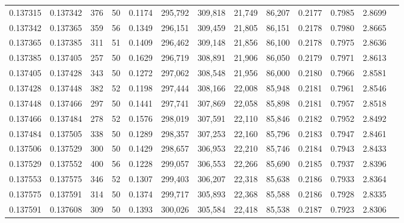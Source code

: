 \begin{tabular}{rrrrrrrrrrrrr}
0.137315 & 0.137342 &   376 &  50 &                                     0.1174 & 295,792 & 309,818 &  21,749 &  86,207 & 0.2177 & 0.7985 & 2.8699 \\
0.137342 & 0.137365 &   359 &  56 &                                     0.1349 & 296,151 & 309,459 &  21,805 &  86,151 & 0.2178 & 0.7980 & 2.8665 \\
0.137365 & 0.137385 &   311 &  51 &                                     0.1409 & 296,462 & 309,148 &  21,856 &  86,100 & 0.2178 & 0.7975 & 2.8636 \\
0.137385 & 0.137405 &   257 &  50 &                                     0.1629 & 296,719 & 308,891 &  21,906 &  86,050 & 0.2179 & 0.7971 & 2.8613 \\
0.137405 & 0.137428 &   343 &  50 &                                     0.1272 & 297,062 & 308,548 &  21,956 &  86,000 & 0.2180 & 0.7966 & 2.8581 \\
0.137428 & 0.137448 &   382 &  52 &                                     0.1198 & 297,444 & 308,166 &  22,008 &  85,948 & 0.2181 & 0.7961 & 2.8546 \\
0.137448 & 0.137466 &   297 &  50 &                                     0.1441 & 297,741 & 307,869 &  22,058 &  85,898 & 0.2181 & 0.7957 & 2.8518 \\
0.137466 & 0.137484 &   278 &  52 &                                     0.1576 & 298,019 & 307,591 &  22,110 &  85,846 & 0.2182 & 0.7952 & 2.8492 \\
0.137484 & 0.137505 &   338 &  50 &                                     0.1289 & 298,357 & 307,253 &  22,160 &  85,796 & 0.2183 & 0.7947 & 2.8461 \\
0.137506 & 0.137529 &   300 &  50 &                                     0.1429 & 298,657 & 306,953 &  22,210 &  85,746 & 0.2184 & 0.7943 & 2.8433 \\
0.137529 & 0.137552 &   400 &  56 &                                     0.1228 & 299,057 & 306,553 &  22,266 &  85,690 & 0.2185 & 0.7937 & 2.8396 \\
0.137553 & 0.137575 &   346 &  52 &                                     0.1307 & 299,403 & 306,207 &  22,318 &  85,638 & 0.2186 & 0.7933 & 2.8364 \\
0.137575 & 0.137591 &   314 &  50 &                                     0.1374 & 299,717 & 305,893 &  22,368 &  85,588 & 0.2186 & 0.7928 & 2.8335 \\
0.137591 & 0.137608 &   309 &  50 &                                     0.1393 & 300,026 & 305,584 &  22,418 &  85,538 & 0.2187 & 0.7923 & 2.8306 \\

\end{tabular}
